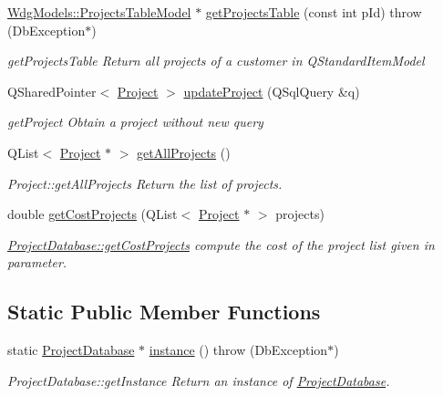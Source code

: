 \begin{DoxyCompactItemize}
\hyperlink{classGui_1_1Widgets_1_1WdgModels_1_1ProjectsTableModel}{Wdg\+Models\+::\+Projects\+Table\+Model} $\ast$ \hyperlink{classDatabases_1_1ProjectDatabase_ac00628f2d8911298dcb0292f6c4cff66}{get\+Projects\+Table} (const int p\+Id)  throw (\+Db\+Exception$\ast$)
\begin{DoxyCompactList}\small\item\em get\+Projects\+Table Return all projects of a customer in Q\+Standard\+Item\+Model \end{DoxyCompactList}\item 
Q\+Shared\+Pointer$<$ \hyperlink{classModels_1_1Project}{Project} $>$ \hyperlink{classDatabases_1_1ProjectDatabase_ab644aeb47d9666e8191cc9bc6ab93417}{update\+Project} (Q\+Sql\+Query \&q)
\begin{DoxyCompactList}\small\item\em get\+Project Obtain a project without new query \end{DoxyCompactList}\item 
Q\+List$<$ \hyperlink{classModels_1_1Project}{Project} $\ast$ $>$ \hyperlink{classDatabases_1_1ProjectDatabase_ac2532676aabcc8f304b2a3ddf4892205}{get\+All\+Projects} ()
\begin{DoxyCompactList}\small\item\em Project\+::get\+All\+Projects Return the list of projects. \end{DoxyCompactList}\item 
double \hyperlink{classDatabases_1_1ProjectDatabase_a5629637e3611002aa024c4a275239cae}{get\+Cost\+Projects} (Q\+List$<$ \hyperlink{classModels_1_1Project}{Project} $\ast$ $>$ projects)
\begin{DoxyCompactList}\small\item\em \hyperlink{classDatabases_1_1ProjectDatabase_a5629637e3611002aa024c4a275239cae}{Project\+Database\+::get\+Cost\+Projects} compute the cost of the project list given in parameter. \end{DoxyCompactList}\end{DoxyCompactItemize}
\subsection*{Static Public Member Functions}
\begin{DoxyCompactItemize}
\item 
static \hyperlink{classDatabases_1_1ProjectDatabase}{Project\+Database} $\ast$ \hyperlink{classDatabases_1_1ProjectDatabase_a75cf81b8d073addcf43a313483dafe65}{instance} ()  throw (\+Db\+Exception$\ast$)
\begin{DoxyCompactList}\small\item\em Project\+Database\+::get\+Instance Return an instance of \hyperlink{classDatabases_1_1ProjectDatabase}{Project\+Database}. \end{DoxyCompactList}\end{DoxyCompactItemize}
